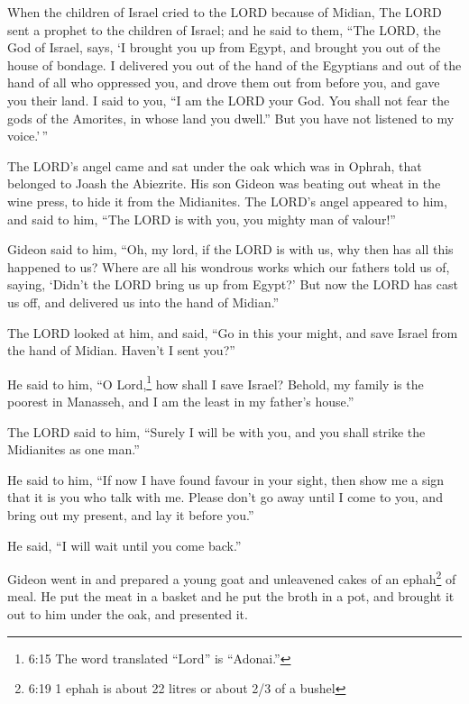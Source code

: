  When the children of Israel cried to the LORD because of
Midian,  The LORD sent a prophet to the children of Israel;
and he said to them, ``The LORD, the God of Israel, says, `I brought you
up from Egypt, and brought you out of the house of bondage. 
I delivered you out of the hand of the Egyptians and out of the hand of
all who oppressed you, and drove them out from before you, and gave you
their land.  I said to you, ``I am the LORD your God. You
shall not fear the gods of the Amorites, in whose land you dwell.'' But
you have not listened to my voice.'\,''

 The LORD's angel came and sat under the oak which was in
Ophrah, that belonged to Joash the Abiezrite. His son Gideon was beating
out wheat in the wine press, to hide it from the Midianites.
 The LORD's angel appeared to him, and said to him, ``The
LORD is with you, you mighty man of valour!''

 Gideon said to him, ``Oh, my lord, if the LORD is with us,
why then has all this happened to us? Where are all his wondrous works
which our fathers told us of, saying, `Didn't the LORD bring us up from
Egypt?' But now the LORD has cast us off, and delivered us into the hand
of Midian.''

 The LORD looked at him, and said, ``Go in this your might,
and save Israel from the hand of Midian. Haven't I sent you?''

 He said to him, ``O Lord,\footnote{6:15 The word
  translated ``Lord'' is ``Adonai.''} how shall I save Israel? Behold,
my family is the poorest in Manasseh, and I am the least in my father's
house.''

 The LORD said to him, ``Surely I will be with you, and you
shall strike the Midianites as one man.''

 He said to him, ``If now I have found favour in your
sight, then show me a sign that it is you who talk with me.
 Please don't go away until I come to you, and bring out my
present, and lay it before you.''

He said, ``I will wait until you come back.''

 Gideon went in and prepared a young goat and unleavened
cakes of an ephah\footnote{6:19 1 ephah is about 22 litres or about 2/3
  of a bushel} of meal. He put the meat in a basket and he put the broth
in a pot, and brought it out to him under the oak, and presented it.

